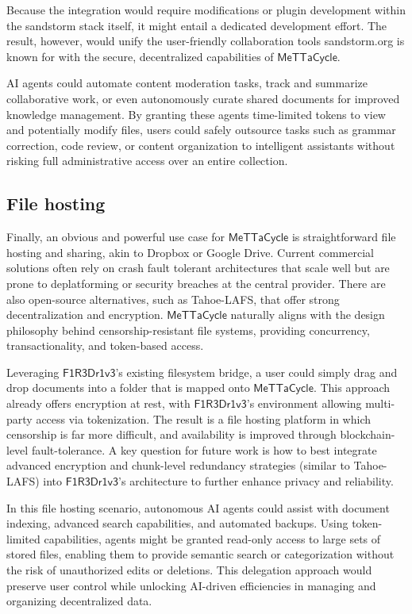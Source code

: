 \documentclass{article}
\newcommand{\MC}{\mathsf{MeTTaCycle}}
\newcommand{\FD}{\mathsf{F1R3Dr1v3}}
\begin{document}
Because the integration would require modifications or plugin development within the sandstorm stack itself, it might entail a dedicated development effort. The result, however, would unify the user-friendly collaboration tools sandstorm.org is known for with the secure, decentralized capabilities of $\MC$.

AI agents could automate content moderation tasks, track and summarize collaborative work, or even autonomously curate shared documents for improved knowledge management. By granting these agents time-limited tokens to view and potentially modify files, users could safely outsource tasks such as grammar correction, code review, or content organization to intelligent assistants without risking full administrative access over an entire collection.

\subsection{File hosting}

Finally, an obvious and powerful use case for $\MC$ is straightforward file hosting and sharing, akin to Dropbox or Google Drive. Current commercial solutions often rely on crash fault tolerant architectures that scale well but are prone to deplatforming or security breaches at the central provider. There are also open-source alternatives, such as Tahoe-LAFS, that offer strong decentralization and encryption. $\MC$ naturally aligns with the design philosophy behind censorship-resistant file systems, providing concurrency, transactionality, and token-based access.

Leveraging $\FD$'s existing filesystem bridge, a user could simply drag and drop documents into a folder that is mapped onto $\MC$. This approach already offers encryption at rest, with $\FD$'s environment allowing multi-party access via tokenization. The result is a file hosting platform in which censorship is far more difficult, and availability is improved through blockchain-level fault-tolerance. A key question for future work is how to best integrate advanced encryption and chunk-level redundancy strategies (similar to Tahoe-LAFS) into $\FD$'s architecture to further enhance privacy and reliability.

In this file hosting scenario, autonomous AI agents could assist with document indexing, advanced search capabilities, and automated backups. Using token-limited capabilities, agents might be granted read-only access to large sets of stored files, enabling them to provide semantic search or categorization without the risk of unauthorized edits or deletions. This delegation approach would preserve user control while unlocking AI-driven efficiencies in managing and organizing decentralized data.
\end{document}
